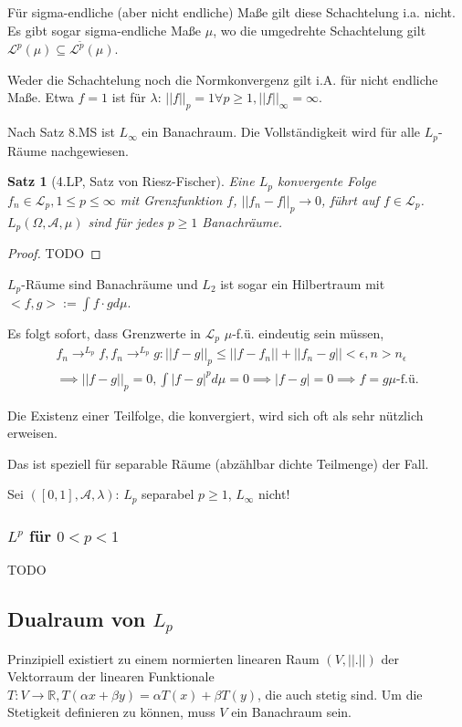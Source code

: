 \documentclass[]{article}
\newtheorem{theorem}{Satz}
\begin{document}
Für sigma-endliche (aber nicht endliche) Maße gilt diese Schachtelung i.a. nicht. Es gibt sogar sigma-endliche Maße $\mu$, wo die umgedrehte Schachtelung gilt $\mathcal{L}^p(\mu) \subseteq \mathcal{L}^{\tilde{p}}(\mu)$.

Weder die Schachtelung noch die Normkonvergenz gilt i.A. für nicht endliche Maße. Etwa $f=1$ ist für $\lambda$: $||f||_p = 1 \forall p \geq 1, ||f||_\infty = \infty$.

Nach Satz 8.MS ist $L_\infty$ ein Banachraum. Die Vollständigkeit wird für alle $L_p$-Räume nachgewiesen.

\begin{theorem}[4.LP, Satz von Riesz-Fischer]
	Eine $L_p$ konvergente Folge $f_n \in \mathcal{L}_p, 1 \leq p \leq \infty$ mit Grenzfunktion $f$, $||f_n - f||_p \rightarrow 0$, führt auf $f \in \mathcal{L}_p$. $L_p(\Omega, \mathcal{A}, \mu)$ sind für jedes $p \geq 1$ Banachräume.
\end{theorem}

\begin{proof}
	TODO
\end{proof}

$L_p$-Räume sind Banachräume und $L_2$ ist sogar ein Hilbertraum mit $<f,g> := \int f\cdot g d\mu$.

Es folgt sofort, dass Grenzwerte in $\mathcal{L}_p$ $\mu$-f.ü. eindeutig sein müssen,
\begin{align*}
	f_n \rightarrow^{L_p} f, f_n \rightarrow^{L_p} g : ||f-g||_p \leq ||f-f_n|| + ||f_n - g|| < \epsilon, n > n_\epsilon\\
	\implies ||f-g||_p = 0, \int |f-g|^p d\mu = 0 \implies |f-g|=0 \implies f=g \mu\text{-f.ü.}
\end{align*}

Die Existenz einer Teilfolge, die konvergiert, wird sich oft als sehr nützlich erweisen.

Das ist speziell für separable Räume (abzählbar dichte Teilmenge) der Fall.

Sei $([0,1], \mathcal{A}, \lambda)$: $L_p$ separabel $p\geq 1$, $L_\infty$ nicht!

\subsubsection{$L^p$ für $0<p<1$}
TODO

\subsection{Dualraum von $L_p$}
Prinzipiell existiert zu einem normierten linearen Raum $(V, ||.||)$ der Vektorraum der linearen Funktionale $T:V\rightarrow\mathbb{R}, T(\alpha x + \beta y) = \alpha T(x) + \beta T(y)$, die auch stetig sind. Um die Stetigkeit definieren zu können, muss $V$ ein Banachraum sein.
\end{document}
